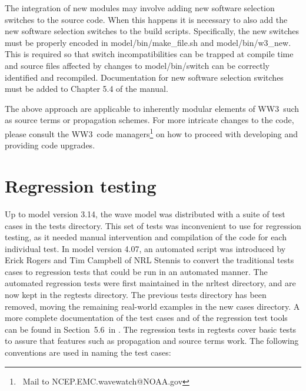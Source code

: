 \documentclass[12pt]{article}
\newcommand{\manref}{tol:MMABmanual}
\newcommand{\manregtestsec}{5.6}
\newcommand{\ws}{WW3}
\newcommand{\file}{\sf}
\newcommand{\pb}{\strut \vfill \pagebreak}
\newcommand{\newsec}{\setcounter{equation}{0}
                      \setcounter{myfigno}{0}
                      \setcounter{mytabno}{0}}
\newcounter{myfigno}[section]
\newcounter{mytabno}[section]
\begin{document}
\vspace{\baselineskip} \noindent The integration of new modules may involve
adding new software selection switches to the source code. When this happens
it is necessary to also add the new software selection switches to the build
scripts.  Specifically, the new switches must be properly encoded in {\file
  model/bin/make\_file.sh} and {\file model/bin/w3\_new}. This is required so
that switch incompatibilities can be trapped at compile time and source files
affected by changes to {\file model/bin/switch} can be correctly identified
and recompiled. Documentation for new software selection switches must be
added to Chapter 5.4 of the manual.

\vspace{\baselineskip} \noindent The above approach are applicable to
inherently modular elements of \ws\ such as source terms or propagation
schemes. For more intricate changes to the code, please consult the \ws\ code
managers\footnote{~Mail to NCEP.EMC.wavewatch@NOAA.gov} on how to proceed with
developing and providing code upgrades.


\pb
\section{Regression testing} \label{sec:testing}
\newsec

Up to model version 3.14, the wave model was distributed with a suite of test
cases in the {\file tests} directory. This set of tests was inconvenient to
use for regression testing, as it needed manual intervention and compilation
of the code for each individual test. In model version 4.07, an automated
script was introduced by Erick Rogers and Tim Campbell of NRL Stennis to
convert the traditional tests cases to regression tests that could be run in
an automated manner. The automated regression tests were first maintained in
the {\file nrltest} directory, and are now kept in the {\file regtests}
directory.  The previous {\file tests} directory has been removed, moving the
remaining real-world examples in the new {\file cases} directory. A more
complete documentation of the test cases and of the regression test tools can
be found in Section~\manregtestsec\ in \cite{\manref}.  The regression tests
in {\file regtests} cover basic tests to assure that features such as
propagation and source terms work. The following conventions are used in
naming the test cases:
\end{document}
